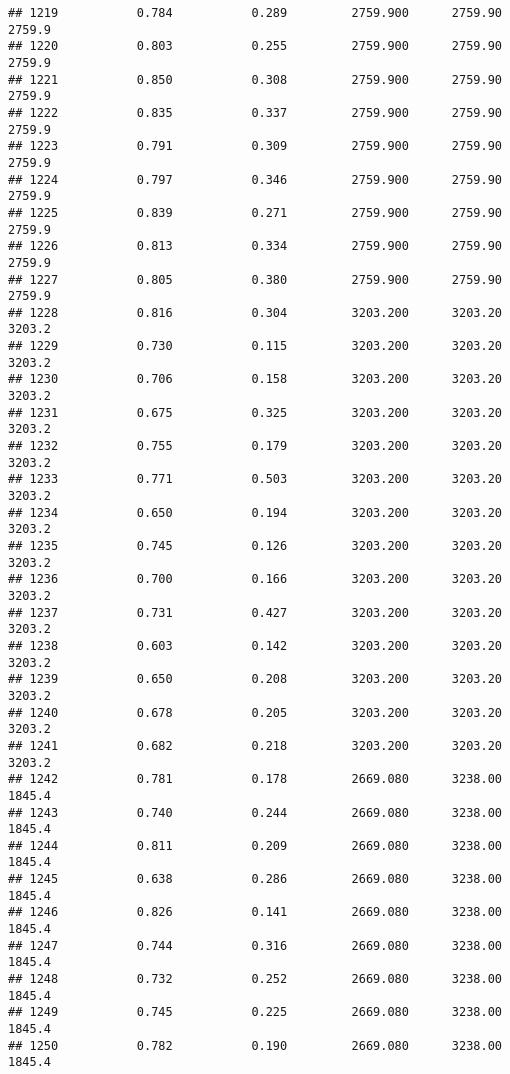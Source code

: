 \documentclass[
]{article}
\begin{document}
\begin{verbatim}
## 1219           0.784           0.289         2759.900      2759.90       2759.9
## 1220           0.803           0.255         2759.900      2759.90       2759.9
## 1221           0.850           0.308         2759.900      2759.90       2759.9
## 1222           0.835           0.337         2759.900      2759.90       2759.9
## 1223           0.791           0.309         2759.900      2759.90       2759.9
## 1224           0.797           0.346         2759.900      2759.90       2759.9
## 1225           0.839           0.271         2759.900      2759.90       2759.9
## 1226           0.813           0.334         2759.900      2759.90       2759.9
## 1227           0.805           0.380         2759.900      2759.90       2759.9
## 1228           0.816           0.304         3203.200      3203.20       3203.2
## 1229           0.730           0.115         3203.200      3203.20       3203.2
## 1230           0.706           0.158         3203.200      3203.20       3203.2
## 1231           0.675           0.325         3203.200      3203.20       3203.2
## 1232           0.755           0.179         3203.200      3203.20       3203.2
## 1233           0.771           0.503         3203.200      3203.20       3203.2
## 1234           0.650           0.194         3203.200      3203.20       3203.2
## 1235           0.745           0.126         3203.200      3203.20       3203.2
## 1236           0.700           0.166         3203.200      3203.20       3203.2
## 1237           0.731           0.427         3203.200      3203.20       3203.2
## 1238           0.603           0.142         3203.200      3203.20       3203.2
## 1239           0.650           0.208         3203.200      3203.20       3203.2
## 1240           0.678           0.205         3203.200      3203.20       3203.2
## 1241           0.682           0.218         3203.200      3203.20       3203.2
## 1242           0.781           0.178         2669.080      3238.00       1845.4
## 1243           0.740           0.244         2669.080      3238.00       1845.4
## 1244           0.811           0.209         2669.080      3238.00       1845.4
## 1245           0.638           0.286         2669.080      3238.00       1845.4
## 1246           0.826           0.141         2669.080      3238.00       1845.4
## 1247           0.744           0.316         2669.080      3238.00       1845.4
## 1248           0.732           0.252         2669.080      3238.00       1845.4
## 1249           0.745           0.225         2669.080      3238.00       1845.4
## 1250           0.782           0.190         2669.080      3238.00       1845.4

\end{verbatim}
\end{document}
